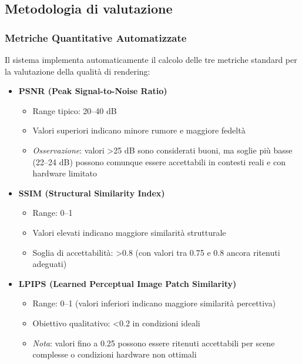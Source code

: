 \subsection{Metodologia di valutazione}
\label{subsec:metodologia_valutazione}

\subsubsection{Metriche Quantitative Automatizzate}

Il sistema implementa automaticamente il calcolo delle tre metriche standard per la valutazione della qualità di rendering:

\begin{itemize} 
	\item \textbf{PSNR (Peak Signal-to-Noise Ratio)}
\begin{itemize}
	\item Range tipico: 20--40 dB
	\item Valori superiori indicano minore rumore e maggiore fedelt\`a
	\item \textit{Osservazione}: valori \textgreater 25 dB sono considerati buoni, ma soglie pi\`u basse (22--24 dB) possono comunque essere accettabili in contesti reali e con hardware limitato
\end{itemize}

\item \textbf{SSIM (Structural Similarity Index)}
\begin{itemize}
	\item Range: 0--1
	\item Valori elevati indicano maggiore similarit\`a strutturale
	\item Soglia di accettabilit\`a: \textgreater 0.8 (con valori tra 0.75 e 0.8 ancora ritenuti adeguati)
\end{itemize}

\item \textbf{LPIPS (Learned Perceptual Image Patch Similarity)}
\begin{itemize}
	\item Range: 0--1 (valori inferiori indicano maggiore similarit\`a percettiva)
	\item Obiettivo qualitativo: \textless 0.2 in condizioni ideali
	\item \textit{Nota}: valori fino a 0.25 possono essere ritenuti accettabili per scene complesse o condizioni hardware non ottimali
\end{itemize}
\end{itemize}
